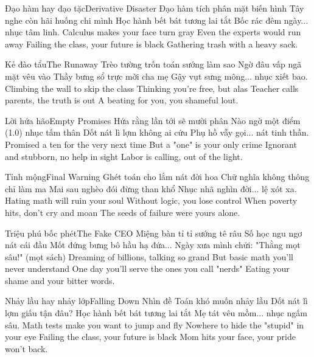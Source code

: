 \begin{tutuyetbox}{Đạo hàm hay đạo tặc}{Derivative Disaster}
Đạo hàm tích phân mặt biến hình
Tây nghe còn hãi huống chi mình
Học hành bết bát tương lai tắt
Bốc rác đêm ngày... nhục tâm linh.
\tcblower
Calculus makes your face turn gray
Even the experts would run away
Failing the class, your future is black
Gathering trash with a heavy sack.
\end{tutuyetbox}

\begin{tutuyetbox}{Kẻ đào tẩu}{The Runaway}
Trèo tường trốn toán sướng làm sao
Ngờ đâu vấp ngã mặt vêu vào
Thầy bưng sổ trực mời cha mẹ
Gậy vụt sưng mông... nhục xiết bao.
\tcblower
Climbing the wall to skip the class
Thinking you're free, but alas
Teacher calls parents, the truth is out
A beating for you, you shameful lout.
\end{tutuyetbox}

\begin{tutuyetbox}{Lời hứa hão}{Empty Promises}
Hứa rằng lần tới sẽ mười phân
Nào ngờ một điểm (1.0) nhục tấm thân
Dốt nát lì lợm không ai cứu
Phụ hồ vẫy gọi... nát tinh thần.
\tcblower
Promised a ten for the very next time
But a "one" is your only crime
Ignorant and stubborn, no help in sight
Labor is calling, out of the light.
\end{tutuyetbox}

\begin{tutuyetbox}{Tỉnh mộng}{Final Warning}
Ghét toán cho lắm nát đời hoa
Chữ nghĩa không thông chỉ làm ma
Mai sau nghèo đói đừng than khổ
Nhục nhã nghìn đời... lệ xót xa.
\tcblower
Hating math will ruin your soul
Without logic, you lose control
When poverty hits, don't cry and moan
The seeds of failure were yours alone.
\end{tutuyetbox}
\begin{tutuyetbox}{Triệu phú bốc phét}{The Fake CEO}
Miệng bàn tỉ tỉ sướng tê râu
Số học ngu ngơ nát cái đầu
Mốt đứng bưng bô hầu hạ đứa...
Ngày xưa mình chửi: "Thằng mọt sâu!" (mọt sách)
\tcblower
Dreaming of billions, talking so grand
But basic math you'll never understand
One day you'll serve the ones you call "nerds"
Eating your shame and your bitter words.
\end{tutuyetbox}

\begin{tutuyetbox}{Nhảy lầu hay nhảy lớp}{Falling Down}
Nhìn đề Toán khó muốn nhảy lầu
Dốt nát lì lợm giấu tận đâu?
Học hành bết bát tương lai tắt
Mẹ tát vêu mồm... nhục ngấm sâu.
\tcblower
Math tests make you want to jump and fly
Nowhere to hide the "stupid" in your eye
Failing the class, your future is black
Mom hits your face, your pride won't back.
\end{tutuyetbox}


